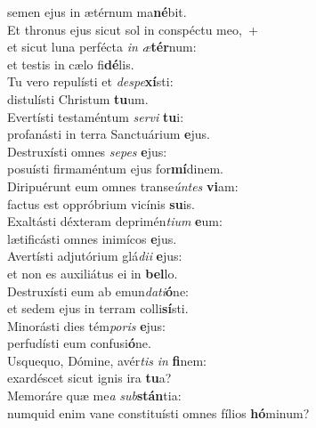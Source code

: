 \oddverse semen ejus in ætérnum ma\textbf{né}bit.\\
\evenverse Et thronus ejus sicut sol in conspéctu meo,~+\\
\evenverse  et sicut luna perfécta \textit{in} \textit{æ}\textbf{tér}num:~\*\\
\evenverse et testis in cælo fi\textbf{dé}lis.\\
\oddverse Tu vero repulísti et \textit{de}\textit{spe}\textbf{xí}sti:~\*\\
\oddverse distulísti Christum \textbf{tu}um.\\
\evenverse Evertísti testaméntum \textit{ser}\textit{vi} \textbf{tu}i:~\*\\
\evenverse profanásti in terra Sanctuárium \textbf{e}jus.\\
\oddverse Destruxísti omnes \textit{se}\textit{pes} \textbf{e}jus:~\*\\
\oddverse posuísti firmaméntum ejus for\textbf{mí}dinem.\\
\evenverse Diripuérunt eum omnes transe\textit{ún}\textit{tes} \textbf{vi}am:~\*\\
\evenverse factus est oppróbrium vicínis \textbf{su}is.\\
\oddverse Exaltásti déxteram deprimén\textit{ti}\textit{um} \textbf{e}um:~\*\\
\oddverse lætificásti omnes inimícos \textbf{e}jus.\\
\evenverse Avertísti adjutórium glá\textit{di}\textit{i} \textbf{e}jus:~\*\\
\evenverse et non es auxiliátus ei in \textbf{bel}lo.\\
\oddverse Destruxísti eum ab emun\textit{da}\textit{ti}\textbf{ó}ne:~\*\\
\oddverse et sedem ejus in terram colli\textbf{sí}sti.\\
\evenverse Minorásti dies tém\textit{po}\textit{ris} \textbf{e}jus:~\*\\
\evenverse perfudísti eum confusi\textbf{ó}ne.\\
\oddverse Usquequo, Dómine, avér\textit{tis} \textit{in} \textbf{fi}nem:~\*\\
\oddverse exardéscet sicut ignis ira \textbf{tu}a?\\
\evenverse Memoráre quæ me\textit{a} \textit{sub}\textbf{stán}tia:~\*\\
\evenverse numquid enim vane constituísti omnes fílios \textbf{hó}minum?\\
